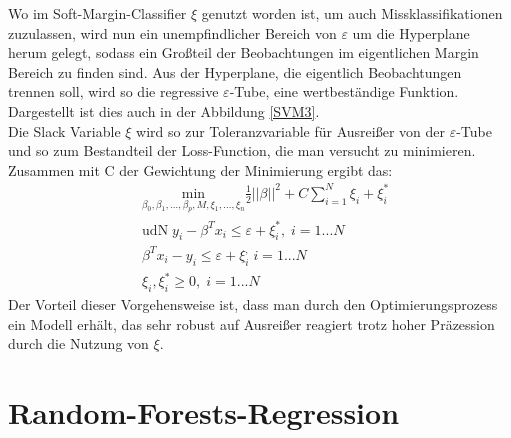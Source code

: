 \documentclass[a4paper,12pt]{thesis}
\begin{document}
Wo im Soft-Margin-Classifier $\xi$ genutzt worden ist, um auch Missklassifikationen zuzulassen, wird nun ein unempfindlicher Bereich von $\varepsilon$ um die Hyperplane herum gelegt, sodass ein Großteil der Beobachtungen im eigentlichen Margin Bereich zu finden sind. Aus der Hyperplane, die eigentlich Beobachtungen trennen soll, wird so die regressive $\varepsilon$-Tube, eine wertbeständige Funktion. Dargestellt ist dies auch in der Abbildung \ref{SVM3}.\\
Die Slack Variable $\xi$ wird so zur Toleranzvariable für Ausreißer von der $\varepsilon$-Tube und so zum Bestandteil der Loss-Function, die man versucht zu minimieren. Zusammen mit C der Gewichtung der Minimierung ergibt das:
\begin{equation}
	\label{SVM:Regression}
	\begin{aligned}
		&\underset{\beta_0, \beta_1, ... , \beta_p,M,\xi_1,...,\xi_n}{\text{min}}\frac{1}{2}||\beta||^2 + C\sum_{i=1}^N \xi_i + \xi_i^*\\
		&\text{udN}\; y_i - \beta^T x_i \leq \varepsilon + \xi_i^*, \; i=1...N\\
		&\beta^T x_i - y_i \leq \varepsilon + \xi_i^, \; i=1...N\\
		&\xi_i, \xi_i^* \geq 0, \; i=1...N
	\end{aligned} 
\end{equation}
Der Vorteil dieser Vorgehensweise ist, dass man durch den Optimierungsprozess ein Modell erhält, das sehr robust auf Ausreißer reagiert trotz hoher Präzession durch die Nutzung von $\xi$.

\section{Random-Forests-Regression}
\end{document}
